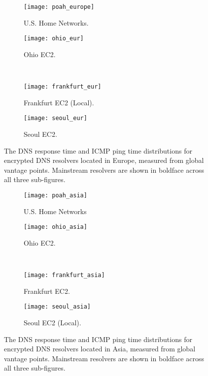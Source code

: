 \begin{figure*}[h!]
\centering
%
\begin{subfigure}[b]{0.4\textwidth}
\texttt{[image: poah\_europe]}
\caption{U.S. Home Networks.}
\end{subfigure}
%
\begin{subfigure}[b]{0.4\textwidth}
\texttt{[image: ohio\_eur]}
\caption{Ohio EC2.}
\end{subfigure}
%
\hfill \\
\begin{subfigure}[b]{0.4\textwidth}
\texttt{[image: frankfurt\_eur]}
    \caption{Frankfurt EC2 (Local).}
\end{subfigure}
%
\begin{subfigure}[b]{0.4\textwidth}
\texttt{[image: seoul\_eur]}
\caption{Seoul EC2.}
\end{subfigure}
\caption{The DNS response time and ICMP ping time distributions for
    encrypted DNS resolvers located in Europe, measured from global vantage points.
    Mainstream resolvers are shown in boldface across all three
    sub-figures.}
\label{fig:dns-europe}
\end{figure*}
\begin{figure*}[h!]
\centering
%
\begin{subfigure}[b]{0.4\textwidth}
\texttt{[image: poah\_asia]}
\caption{U.S. Home Networks}
\end{subfigure}
%
\begin{subfigure}[b]{0.4\textwidth}
\texttt{[image: ohio\_asia]}
\caption{Ohio EC2.}
\end{subfigure}
%
\hfill \\
\begin{subfigure}[b]{0.4\textwidth}
\texttt{[image: frankfurt\_asia]}
    \caption{Frankfurt EC2.}
\end{subfigure}
%
\begin{subfigure}[b]{0.4\textwidth}
\texttt{[image: seoul\_asia]}
    \caption{Seoul EC2 (Local).}
\end{subfigure}
\caption{The DNS response time and ICMP ping time distributions for
    encrypted DNS resolvers located in Asia, measured from global vantage points.
    Mainstream resolvers are shown in boldface across all three
    sub-figures.}
\label{fig:dns-asia}
\end{figure*}
